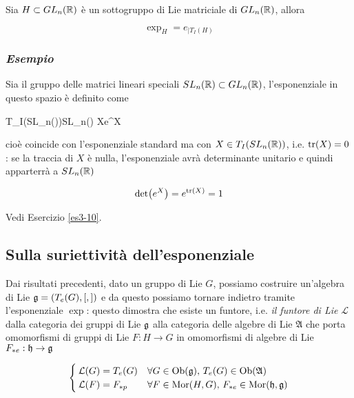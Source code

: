 \begin{corollary}
	Sia $ H \subset GL_{n}(\mathbb{R}) $ è un sottogruppo di Lie matriciale di $ GL_{n}(\mathbb{R}) $, allora
	
	\begin{equation}
		\exp_{H} = e_{| T_{I}(H)}
	\end{equation}
\end{corollary}

\subsubsection{\textit{Esempio}}

Sia il gruppo delle matrici lineari speciali $ SL_{n}(\mathbb{R}) \subset GL_{n}(\mathbb{R}) $, l'esponenziale in questo spazio è definito come

%
	{T_{I}(SL_{n}(\R))}{SL_{n}(\R)}%
	{X}{e^{X}}

cioè coincide con l'esponenziale standard ma con $ X \in T_{I}(SL_{n}(\mathbb{R})) $, i.e. $ \tr(X) = 0 $: se la traccia di $ X $ è nulla, l'esponenziale avrà determinante unitario e quindi apparterrà a $ SL_{n}(\mathbb{R}) $

\begin{equation}
	\det(e^{X}) = e^{\tr(X)} = 1
\end{equation}

Vedi Esercizio \ref{es3-10}.

\subsection{Sulla suriettività dell'esponenziale}

Dai risultati precedenti, dato un gruppo di Lie $ G $, possiamo costruire un'algebra di Lie $ \mathfrak{g} = (T_{e}(G),[,]) $ e da questo possiamo tornare indietro tramite l'esponenziale $ \exp $: questo dimostra che esiste un funtore, i.e. \textit{il funtore di Lie} $ \mathcal{L} $ dalla categoria dei gruppi di Lie $ \mathfrak{g} $ alla categoria delle algebre di Lie $ \mathfrak{A} $ che porta omomorfismi di gruppi di Lie $ F : H \to G $ in omomorfismi di algebre di Lie $ F_{*e} : \mathfrak{h} \to \mathfrak{g} $

\begin{equation}
	\begin{cases}
		\mathcal{L}(G) = T_{e}(G) & \forall G \in \operatorname{Ob}(\mathfrak{g}), \, T_{e}(G) \in \operatorname{Ob}(\mathfrak{A})\\
		\mathcal{L}(F) = F_{*p} & \forall F \in \operatorname{Mor}(H,G), \, F_{*e} \in \operatorname{Mor}(\mathfrak{h},\mathfrak{g})
	\end{cases}
\end{equation}


